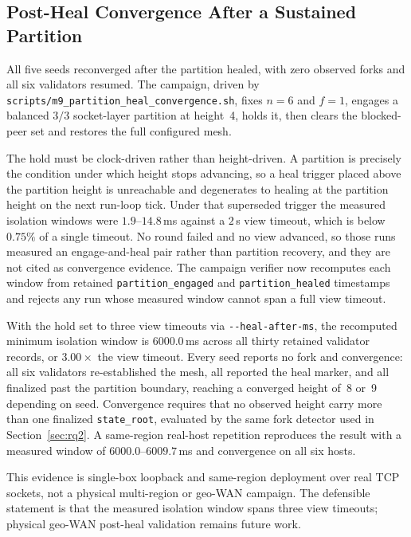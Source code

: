 \documentclass[journal]{IEEEtran}
\theoremstyle{definition}
\theoremstyle{remark}
\begin{document}
\subsection{Post-Heal Convergence After a Sustained Partition}
\label{subsec:partition-heal}
All five seeds reconverged after the partition healed, with zero observed forks and all six
validators resumed. The campaign, driven by
\texttt{scripts/m9\_partition\_heal\_convergence.sh}, fixes $n=6$ and $f=1$, engages a balanced
$3/3$ socket-layer partition at height~4, holds it, then clears the blocked-peer set and restores the
full configured mesh.

The hold must be clock-driven rather than height-driven. A partition is precisely the condition under
which height stops advancing, so a heal trigger placed above the partition height is unreachable and
degenerates to healing at the partition height on the next run-loop tick. Under that superseded
trigger the measured isolation windows were $1.9$--$14.8$\,ms against a $2$\,s view timeout, which is
below $0.75\%$ of a single timeout. No round failed and no view advanced, so those runs measured an
engage-and-heal pair rather than partition recovery, and they are not cited as convergence evidence.
The campaign verifier now recomputes each window from retained \texttt{partition\_engaged} and
\texttt{partition\_healed} timestamps and rejects any run whose measured window cannot span a full
view timeout.

With the hold set to three view timeouts via \texttt{-{}-heal-after-ms}, the recomputed minimum
isolation window is $6000.0$\,ms across all thirty retained validator records, or $3.00\times$ the
view timeout. Every seed reports no fork and convergence: all six validators re-established the mesh,
all reported the heal marker, and all finalized past the partition boundary, reaching a converged
height of~8 or~9 depending on seed. Convergence requires that no observed height carry more than one
finalized \texttt{state\_root}, evaluated by the same fork detector used in
Section~\ref{sec:rq2}. A same-region real-host repetition reproduces the result with a measured
window of $6000.0$--$6009.7$\,ms and convergence on all six hosts.

This evidence is single-box loopback and same-region deployment over real TCP sockets, not a physical
multi-region or geo-WAN campaign. The defensible statement is that the measured isolation window
spans three view timeouts; physical geo-WAN post-heal validation remains future work.
\end{document}
